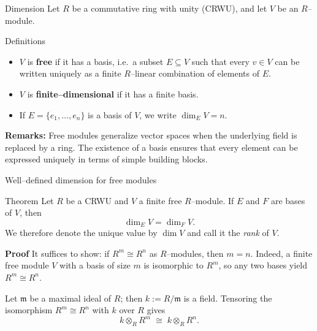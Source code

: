 
\date{20 October 2025}



\begin{frame}
  \cmctitleframe
\end{frame}

\begin{frame}{Dimension}
Let $R$ be a commutative ring with unity (CRWU), and let $V$ be an $R$–module.

\begin{block}{Definitions}
\begin{itemize}
  \item $V$ is \textbf{free} if it has a basis, i.e.\ a subset $E\subseteq V$ such that every $v\in V$ can be written uniquely as a finite $R$–linear combination of elements of $E$.
  \item $V$ is \textbf{finite–dimensional} if it has a finite basis.
  \item If $E=\{e_1,\dots,e_n\}$ is a basis of $V$, we write $\dim_E V = n$.
\end{itemize}
\end{block}

\textbf{Remarks:} Free modules generalize vector spaces when the underlying field is replaced by a ring. The existence of a basis ensures that every element can be expressed uniquely in terms of simple building blocks.

\end{frame}


\begin{frame}{Well–defined dimension for free modules}


\begin{block}{Theorem }
Let $R$ be a CRWU and $V$ a finite free $R$–module. If $E$ and $F$ are bases of $V$, then
\[
\dim_E V = \dim_F V.
\]
We therefore denote the unique value by $\dim V$ and call it the \emph{rank} of $V$.
\end{block}
\textbf{Proof}
It suffices to show: if $R^m \cong R^n$ as $R$–modules, then $m=n$.
Indeed, a finite free module $V$ with a basis of size $m$ is isomorphic to $R^m$, so any two bases yield $R^m \cong R^n$.

Let $\mathfrak m$ be a maximal ideal of $R$; then $k:=R/\mathfrak m$ is a field. Tensoring the isomorphism $R^m \cong R^n$ with $k$ over $R$ gives
\[
k \otimes_R R^m \;\cong\; k \otimes_R R^n.
\]
\end{frame}

